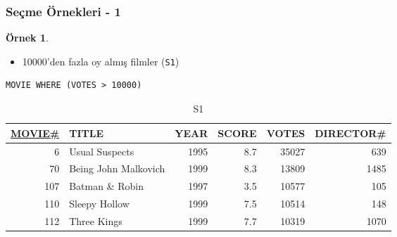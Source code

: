\documentclass[dvipsnames]{beamer}
\theoremstyle{definition}
\theoremstyle{example}
\newtheorem{ornek}[theorem]{Örnek}
\theoremstyle{plain}
\begin{document}
\begin{frame}[fragile]
  \frametitle{Seçme Örnekleri - 1}

  \begin{ornek}
    \begin{itemize}
      \item 10000'den fazla oy almış filmler (\texttt{S1})
    \end{itemize}

    \begin{lstlisting}
MOVIE WHERE (VOTES > 10000)
    \end{lstlisting}

    \pause
    \vspace{-10pt}
    \begin{tiny}
    \begin{table}
      \caption{S1}
      \begin{tabular}{|r|l|r|r|r|r|}\hline
\underline{MOVIE\#} & TITLE & YEAR & SCORE & VOTES & DIRECTOR\#\\[2pt]\hline\hline
  6 & Usual Suspects        & 1995 &   8.7 & 35027 &        639\\\hline
 70 & Being John Malkovich  & 1999 &   8.3 & 13809 &       1485\\\hline
107 & Batman \& Robin       & 1997 &   3.5 & 10577 &        105\\\hline
110 & Sleepy Hollow         & 1999 &   7.5 & 10514 &        148\\\hline
112 & Three Kings           & 1999 &   7.7 & 10319 &       1070\\\hline
      \end{tabular}
    \end{table}
    \end{tiny}
  \end{ornek}
\end{frame}
\end{document}
